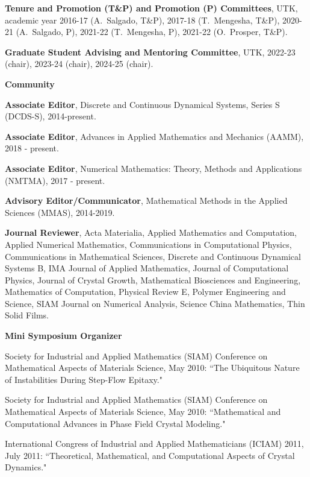 \documentclass[11pt]{letter}
\begin{document}
\begin{description}
\begin{description}
	\item
\textbf{Tenure and Promotion (T\&P) and Promotion (P) Committees}, UTK, academic year 2016-17 (A.~Salgado, T\&P), 2017-18 (T.~Mengesha, T\&P), 2020-21 (A.~Salgado, P), 2021-22 (T.~Mengesha, P), 2021-22 (O.~Prosper, T\&P).

	\item
\textbf{Graduate Student Advising and Mentoring Committee}, UTK, 2022-23 (chair), 2023-24 (chair), 2024-25 (chair).


    \end{description}
    \item
{\Large\bf Community}
    \begin{description}
    \item
\textbf{Associate Editor},  Discrete and Continuous Dynamical Systems, Series S (DCDS-S), 2014-present.
	\item
\textbf{Associate Editor}, Advances in Applied Mathematics and Mechanics (AAMM), 2018 - present.
	\item
\textbf{Associate Editor}, Numerical Mathematics: Theory, Methods and Applications (NMTMA), 2017 - present.
    \item
\textbf{Advisory Editor/Communicator}, Mathematical Methods in the Applied Sciences (MMAS), 2014-2019.
    \item
\textbf{Journal Reviewer}, Acta Materialia, Applied Mathematics and Computation, Applied Numerical Mathematics, Communications in Computational Physics, Communications in Mathematical Sciences, Discrete and Continuous Dynamical Systems B, IMA Journal of Applied Mathematics, Journal of Computational Physics, Journal of Crystal Growth, Mathematical Biosciences and Engineering, Mathematics of Computation, Physical Review E, Polymer Engineering and Science, SIAM Journal on Numerical Analysis, Science China Mathematics, Thin Solid Films.
    \item
\textbf{Mini Symposium Organizer}
	\begin{description}
	\item
Society for Industrial and Applied Mathematics (SIAM) Conference on Mathematical Aspects of Materials Science, May 2010: ``The Ubiquitous Nature of Instabilities During Step-Flow Epitaxy."
    \item
Society for Industrial and Applied Mathematics (SIAM) Conference on Mathematical Aspects of Materials Science, May 2010: ``Mathematical and Computational Advances in Phase Field Crystal Modeling."
    \item
International Congress of Industrial and Applied Mathematicians (ICIAM) 2011, July 2011: ``Theoretical, Mathematical, and Computational Aspects of Crystal Dynamics."

\end{description}
\end{description}
\end{description}
\end{document}
